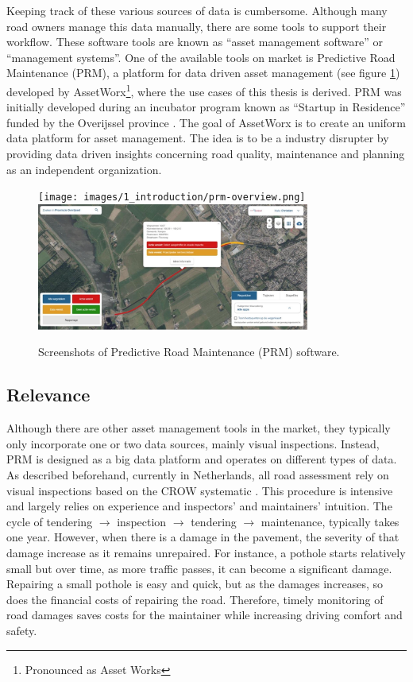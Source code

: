 Keeping track of these various sources of data is cumbersome. Although many road owners manage this data manually, there are some tools to support their workflow. These software tools are known as ``asset management software'' or ``management systems''. One of the available tools on market is Predictive Road Maintenance (PRM), a platform for data driven asset management (see figure \ref{fig:prm}) developed by AssetWorx\footnote{Pronounced as Asset Works}, where the use cases of this thesis is derived. PRM was initially developed during an incubator program known as ``Startup in Residence'' funded by the Overijssel province \cite{Residense2020}. The goal of AssetWorx is to create an uniform data platform for asset management. The idea is to be a industry disrupter by providing data driven insights concerning road quality, maintenance and planning as an independent organization. 

\begin{figure}[ht]
    \begin{center}
    \texttt{[image: images/1\_introduction/prm-overview.png]}
    \includegraphics[width=0.8\textwidth]{images/1_introduction/prm-detail.png}
    \end{center}
    \caption{Screenshots of Predictive Road Maintenance (PRM) software.}
    \label{fig:prm}
\end{figure}


\subsection{Relevance}
\label{sec:relevance}

Although there are other asset management tools in the market, they typically only incorporate one or two data sources, mainly visual inspections. Instead, PRM is designed as a big data platform and operates on different types of data. As described beforehand, currently in Netherlands, all road assessment rely on visual inspections based on the CROW systematic \cite{CROW_147}. This procedure is intensive and largely relies on experience and inspectors' and maintainers' intuition. The cycle of tendering $\rightarrow$ inspection $\rightarrow$ tendering $\rightarrow$ maintenance, typically takes one year. However, when there is a damage in the pavement, the severity of that damage increase as it remains unrepaired. For instance, a pothole starts relatively small but over time, as more traffic passes, it can become a significant damage. Repairing a small pothole is easy and quick, but as the damages increases, so does the financial costs of repairing the road. Therefore, timely monitoring of road damages saves costs for the maintainer while increasing driving comfort and safety.

